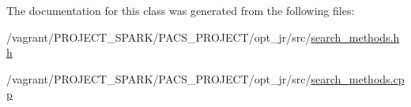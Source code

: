 The documentation for this class was generated from the following files\-:\begin{DoxyCompactItemize}
\item 
/vagrant/\-P\-R\-O\-J\-E\-C\-T\-\_\-\-S\-P\-A\-R\-K/\-P\-A\-C\-S\-\_\-\-P\-R\-O\-J\-E\-C\-T/opt\-\_\-jr/src/\hyperlink{search__methods_8hh}{search\-\_\-methods.\-hh}\item 
/vagrant/\-P\-R\-O\-J\-E\-C\-T\-\_\-\-S\-P\-A\-R\-K/\-P\-A\-C\-S\-\_\-\-P\-R\-O\-J\-E\-C\-T/opt\-\_\-jr/src/\hyperlink{search__methods_8cpp}{search\-\_\-methods.\-cpp}\end{DoxyCompactItemize}
